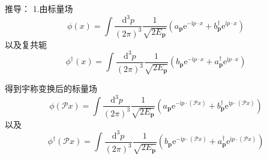 推导：
1.由标量场
\begin{equation}
    \phi (x)=\int{\frac{\mathrm{d}^3p}{\left( 2\pi \right) ^3}}\frac{1}{\sqrt{2E_{\mathbf{p}}}}\left( a_{\mathbf{p}}\mathrm{e}^{-\mathrm{i}p\cdot x}+b_{\mathbf{p}}^{\dagger}\mathrm{e}^{\mathrm{i}p\cdot x} \right) 
\end{equation}
以及复共轭
\begin{equation}
    \phi ^{\dagger}(x)=\int{\frac{\mathrm{d}^3p}{\left( 2\pi \right) ^3}}\frac{1}{\sqrt{2E_{\mathbf{p}}}}\left( b_{\mathbf{p}}\mathrm{e}^{-\mathrm{i}p\cdot x}+a_{\mathbf{p}}^{\dagger}\mathrm{e}^{\mathrm{i}p\cdot x} \right) 
\end{equation}

得到宇称变换后的标量场
\begin{equation}
    \phi (\mathcal{P} x)=\int{\frac{\mathrm{d}^3p}{\left( 2\pi \right) ^3}}\frac{1}{\sqrt{2E_{\mathbf{p}}}}\left( a_{\mathbf{p}}\mathrm{e}^{-\mathrm{i}p\cdot \left( \mathcal{P} x \right)}+b_{\mathbf{p}}^{\dagger}\mathrm{e}^{\mathrm{i}p\cdot \left( \mathcal{P} x \right)} \right) 
\end{equation}
以及
\begin{equation}
    \phi ^{\dagger}(\mathcal{P} x)=\int{\frac{\mathrm{d}^3p}{\left( 2\pi \right) ^3}}\frac{1}{\sqrt{2E_{\mathbf{p}}}}\left( b_{\mathbf{p}}\mathrm{e}^{-\mathrm{i}p\cdot \left( \mathcal{P} x \right)}+a_{\mathbf{p}}^{\dagger}\mathrm{e}^{\mathrm{i}p\cdot \left( \mathcal{P} x \right)} \right) 
\end{equation}

